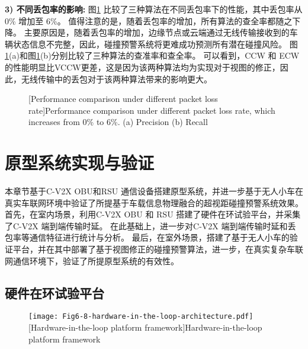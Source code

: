 \textbf{3) 不同丢包率的影响:}
图\ref{fig 6-7} 比较了三种算法在不同丢包率下的性能，其中丢包率从 0\% 增加至 6\%。
值得注意的是，随着丢包率的增加，所有算法的查全率都随之下降。
主要原因是，随着丢包率的增加，边缘节点或云端通过无线传输接收到的车辆状态信息不完整，因此，碰撞预警系统将更难成功预测所有潜在碰撞风险。
图\ref{fig 6-7}(a)和图\ref{fig 6-7}(b)分别比较了三种算法的查准率和查全率。
可以看到，CCW 和 ECW的性能明显比VCCW更差，这是因为该两种算法均为实现对于视图的修正，因此，无线传输中的丢包对于该两种算法带来的影响更大。

\begin{figure}[h]
     \centering
     [Performance comparison under different packet loss rate]{Performance comparison under different packet loss rate, which increases from 0\% to 6\%. (a) Precision (b) Recall}
     \label{fig 6-7}
\end{figure}

\section{原型系统实现与验证}\label{section 6-5}

本章节基于C-V2X OBU和RSU 通信设备搭建原型系统，并进一步基于无人小车在真实车联网环境中验证了所提基于车载信息物理融合的超视距碰撞预警系统效果。
首先，在室内场景，利用C-V2X OBU 和 RSU 搭建了硬件在环试验平台，并采集了C-V2X 端到端传输时延。
在此基础上，进一步对C-V2X 端到端传输时延和丢包率等通信特征进行统计与分析。
最后，在室外场景，搭建了基于无人小车的验证平台，并在其中部署了基于视图修正的碰撞预警算法，进一步，在真实复杂车联网通信环境下，验证了所提原型系统的有效性。

\subsection{硬件在环试验平台}

\begin{figure}[h]
\centering
  \texttt{[image: Fig6-8-hardware-in-the-loop-architecture.pdf]}
  [Hardware-in-the-loop platform framework]{Hardware-in-the-loop platform framework}
  \label{fig 6-8}
\end{figure}

